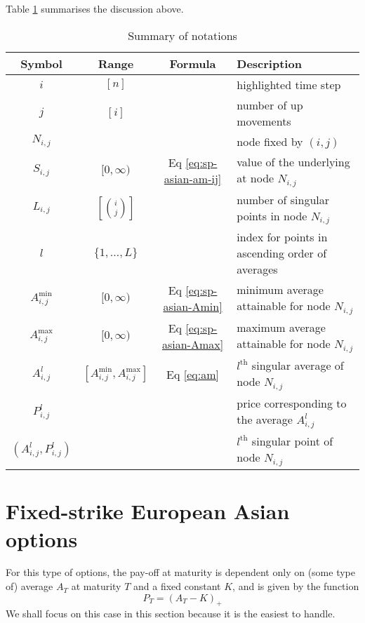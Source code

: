 Table \ref{tab:sp-asian-notations} summarises the discussion above.

\begin{table}
	\label{tab:sp-asian-notations}
	\centering
	\caption{Summary of notations}
	\begin{tabular}{cccl}
		\toprule
		Symbol & Range & Formula & Description \\
		\midrule
		$ i $ & $ [ n ] $ & & highlighted time step \\
		$ j $ & $ [ i ] $ & & number of up movements \\
		$ N_{i,j} $ & & & node fixed by $ (i,j) $ \\
		$ S_{i,j} $ & $ [0, \infty) $ & Eq \ref{eq:sp-asian-am-ij} & value of the underlying at node $ N_{i,j} $ \\
		$ L_{i,j} $ & $ \left[ \binom{i}{j} \right] $ & & number of singular points in node $ N_{i,j} $ \\
		$ l $ & $ \{ 1, \dots, L \} $ & & index for points in ascending order of averages \\
		$ A_{i,j}^{\min} $ & $ [0, \infty) $ & Eq \ref{eq:sp-asian-Amin} & minimum average attainable for node $ N_{i,j} $ \\
		$ A_{i,j}^{\max} $ & $ [0, \infty) $ & Eq \ref{eq:sp-asian-Amax} & maximum average attainable for node $ N_{i,j} $ \\
		$ A_{i,j}^l $ & $ \left[ A_{i,j}^{\min}, A_{i,j}^{\max} \right] $ & Eq \ref{eq:am} & $ l^\mathrm{th} $ singular average of node $ N_{i,j} $ \\
		$ P_{i,j}^l $ & & & price corresponding to the average $ A_{i,j}^l $ \\
		$ (A_{i,j}^l, P_{i,j}^l) $ & & & $ l^\mathrm{th} $ singular point of node $ N_{i,j} $ \\
		\bottomrule
	\end{tabular}
\end{table}



\section{Fixed-strike European Asian options}
\label{sec:fixed-strike-eu}

For this type of options, the pay-off at maturity is dependent only on (some type of) average $ A_T $ at maturity $T$ and a fixed constant $K$, and is given by the function
\begin{equation} \label{eq:sp-asian-price-eu-asian-am}
	P_T = (A_T - K)_+
\end{equation}
We shall focus on this case in this section because it is the easiest to handle.

